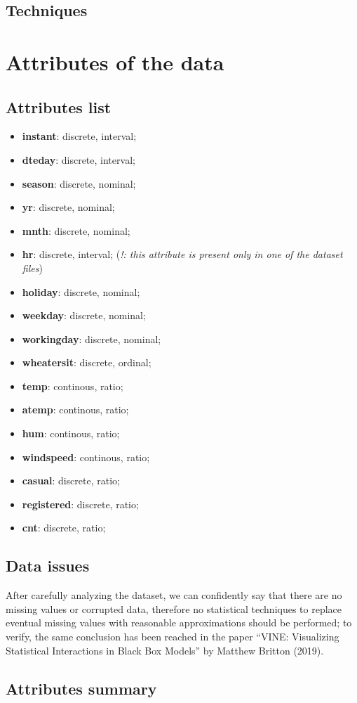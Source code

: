 \documentclass[11pt,a4paper]{article}
\begin{document}
\subsection{Techniques}

\section{Attributes of the data}

\subsection{Attributes list}


\begin{itemize}
    \item \textbf{instant}: discrete, interval;
    \item \textbf{dteday}: discrete, interval;
    \item \textbf{season}: discrete, nominal;
    \item \textbf{yr}: discrete, nominal;
    \item \textbf{mnth}: discrete, nominal;
    \item \textbf{hr}: discrete, interval; (\textit{!: this attribute is present only in one of the dataset files})
    \item \textbf{holiday}: discrete, nominal;
    \item \textbf{weekday}: discrete, nominal;
    \item \textbf{workingday}: discrete, nominal;
    \item \textbf{wheatersit}: discrete, ordinal;
    \item \textbf{temp}: continous, ratio;
    \item \textbf{atemp}: continous, ratio;
    \item \textbf{hum}: continous, ratio;
    \item \textbf{windspeed}: continous, ratio;
    \item \textbf{casual}: discrete, ratio;
    \item \textbf{registered}: discrete, ratio;
    \item \textbf{cnt}: discrete, ratio;
\end{itemize}

\subsection{Data issues}

After carefully analyzing the dataset, we can confidently say that there are no missing values or corrupted data, therefore no statistical techniques to replace eventual missing values with reasonable approximations should be performed; to verify, the same conclusion has been reached in the paper “VINE: Visualizing Statistical Interactions in Black Box Models” by Matthew Britton (2019).

\subsection{Attributes summary}
\end{document}
